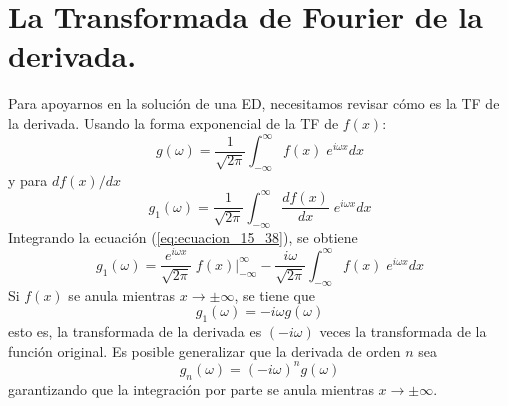 \section{La Transformada de Fourier de la derivada.}
Para apoyarnos en la solución de una ED, necesitamos revisar cómo es la TF de la derivada. Usando la forma exponencial de la TF de $f(x)$:
\begin{equation}
g(\omega) = \dfrac{1}{\sqrt{2 \pi}} \int_{-\infty}^{\infty} f(x) \; e^{i \omega x} dx
\label{eq:ecuacion_15_37}
\end{equation}
y para $d f(x) / dx$
\begin{equation}
g_{1}(\omega) = \dfrac{1}{\sqrt{2 \pi}} \int_{-\infty}^{\infty} \dfrac{d f(x)}{d x} \; e^{i \omega x} dx
\label{eq:ecuacion_15_38}
\end{equation}
Integrando la ecuación (\ref{eq:ecuacion_15_38}), se obtiene
\begin{equation}
g_{1}(\omega) = \dfrac{e^{i \omega x}}{\sqrt{2 \pi}} \; f(x) \Bigr\lvert_{-\infty}^{\infty} - \dfrac{i \omega}{\sqrt{2 \pi}} \int_{-\infty}^{\infty} f(x) \; e^{i \omega x} dx
\label{eq:ecuacion_15_39}
\end{equation}
Si $f(x)$ se anula mientras $x \to \pm \infty$, se tiene que
\begin{equation}
g_{1}(\omega) = - i \omega g(\omega)
\label{eq:ecuacion_15_40}
\end{equation}
esto es, la transformada de la derivada es $(-i \omega)$ veces la transformada de la función original. Es posible generalizar que la derivada de orden $n$ sea
\begin{equation}
g_{n} (\omega) = (- i \omega)^{n} g(\omega)
\label{eq:ecuacion_15_41}
\end{equation}
garantizando que la integración por parte se anula mientras $x \to \pm \infty$.
